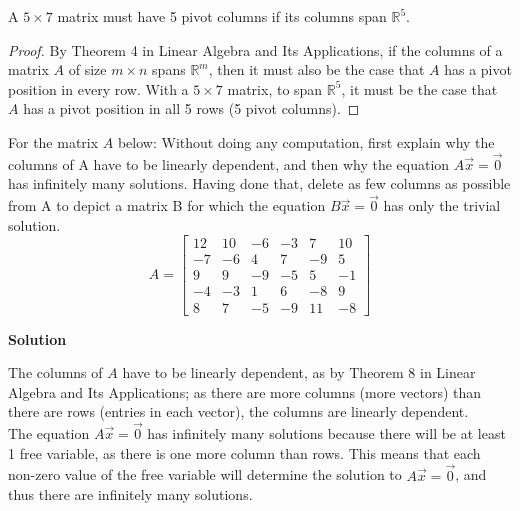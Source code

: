 \documentclass[11pt]{scrartcl}
\theoremstyle{dotlessP}
\theoremstyle{dotlessN}
\newcommand{\reals}{\mathbb{R}} %
\begin{document}
\begin{claim*}
	A $5 \times 7$ matrix must have 5 pivot columns if its columns span $\reals^5$.
\end{claim*}	
\begin{proof}
	By Theorem 4 in Linear Algebra and Its Applications, if the columns of a matrix $A$ of size $m \times n$ spans $\reals^m$, then it must also be the case that $A$ has a pivot position in every row. With a $5 \times 7$ matrix, to span $\reals^5$, it must be the case that $A$ has a pivot position in all 5 rows (5 pivot columns).	
\end{proof}
\begin{ques}
	For the matrix $A$ below: Without doing any computation, first explain why the columns of A have to be linearly dependent, and then why the equation $A\Vec{x} = \Vec{0}$ has infinitely many solutions. Having done that, delete as few columns as possible from A to depict a matrix B for which the equation $B\Vec{x} = \Vec{0}$ has only the trivial solution. 
	\[
	        A = \begin{bmatrix}
            12 & 10 & -6 & -3 & 7 & 10 \\
            -7 & -6 & 4 & 7 & -9 & 5 \\
            9 & 9 & -9 & -5 & 5 & -1 \\
            -4 & -3 & 1 & 6 & -8 & 9 \\
            8 & 7 & -5 & -9 & 11 & -8
        \end{bmatrix}
	\] 
\end{ques}
\textbf{Solution}

The columns of $A$ have to be linearly dependent, as by Theorem 8 in Linear Algebra and Its Applications; as there are more columns (more vectors) than there are rows (entries in each vector), the columns are linearly dependent. 
\\

The equation $A\Vec{x} = \vec{0}$ has infinitely many solutions because there will be at least 1 free variable, as there is one more column than rows. This means that each non-zero value of the free variable will determine the solution to $A\vec{x} = \vec{0}$, and thus there are infinitely many solutions.
\\
\end{document}
